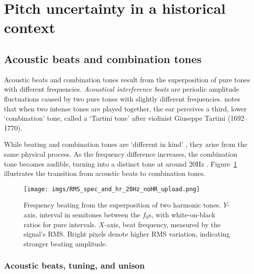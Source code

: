 \documentclass{article}
\begin{document}


\section{Pitch uncertainty in a historical context}
\label{sec:historical-context}

\subsection{Acoustic beats and combination tones}\label{ref:nonlinear}



Acoustic beats and combination tones result from the superposition of pure tones with different frequencies. \emph{Acoustical interference beats} are periodic amplitude fluctuations caused by two pure tones with slightly different frequencies. \citet[p.~12]{turner1977ohm} notes that when two intense tones are played together, the ear perceives a third, lower `combination' tone, called a `Tartini tone' after violinist Giuseppe Tartini (1692--1770). %

While beating and combination tones are `different in kind' \citep[pp.~255]{christensen2006cambridge}, they arise from the same physical process. As the frequency difference increases, the combination tone becomes audible, turning into a distinct tone at around 20Hz \citep[p.~12]{turner1977ohm}. Figure~\ref{fig:RMS_freq_beating} illustrates the transition from acoustic beats to combination tones.



\begin{figure}[htbp]
  \centering
  \texttt{[image: imgs/RMS\_spec\_and\_hr\_20Hz\_noHR\_upload.png]}
  \caption{Frequency beating from the superposition of two harmonic tones. $Y$-axis, interval in semitones between the $f_0$s, with white-on-black ratios for pure intervals. $X$-axis, beat frequency, measured by the signal's RMS. Bright pixels denote higher RMS variation, indicating stronger beating amplitude.
}
\label{fig:RMS_freq_beating}
\end{figure}





\subsubsection{Acoustic beats, tuning, and unison}\label{sec:acousticbeats}
\end{document}
